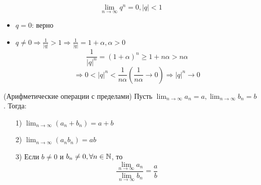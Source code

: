 \begin{example}
\[
\lim_{n\to\infty} q^{n} = 0, |q| < 1
\] 
\begin{itemize}
    \item $q = 0$: верно
    \item $q \neq 0 \Rightarrow \frac{1}{|q|} > 1 \Rightarrow \frac{1}{|q|} = 1 + \alpha, \alpha > 0$
        \[
        \frac{1}{|q|^{n}} = (1 + \alpha)^{n} \geq 1 + n\alpha > n\alpha
        \] 
        \[
        \Rightarrow 0 < |q|^{n} < \frac{1}{n\alpha} (\frac{1}{n\alpha} \rightarrow 0) \Rightarrow |q|^{n} \rightarrow 0
        \] 
\end{itemize}
\end{example}
\begin{theorem}(Арифметические операции с пределами)
Пусть $\lim_{n\to\infty}a_n = a, \lim_{n\to\infty}b_n = b$. Тогда:
\begin{enumerate}
    \item [1) ] $\lim_{n\to\infty}(a_n + b_n) = a + b$ 
    \item [2) ] $\lim_{n\to\infty}(a_n b_n) = ab$
    \item [3) ] Если $b \neq 0$ и $b_n \neq 0, \forall n \in \mathbb{N}$, то
        \[
            \frac{\lim_{n\to\infty}a_n}{\lim_{n\to\infty}b_n} = \frac{a}{b}
        \]
\end{enumerate}
\end{theorem}
